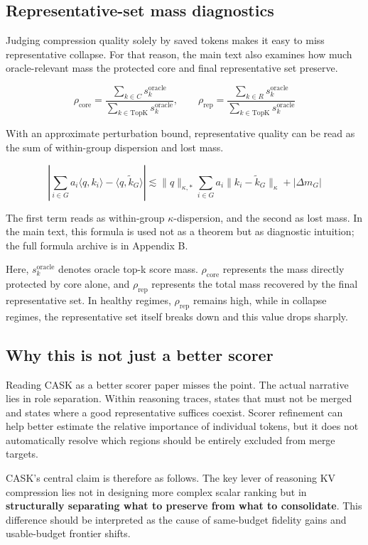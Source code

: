 \subsection{Representative-set mass diagnostics}


Judging compression quality solely by saved tokens makes it easy to miss representative collapse. For that reason, the main text also examines how much oracle-relevant mass the protected core and final representative set preserve.


$$
\rho_{\mathrm{core}}
=
\frac{\sum_{k \in C} s_k^{\mathrm{oracle}}}{\sum_{k \in \mathrm{TopK}} s_k^{\mathrm{oracle}}},
\qquad
\rho_{\mathrm{rep}}
=
\frac{\sum_{k \in R} s_k^{\mathrm{oracle}}}{\sum_{k \in \mathrm{TopK}} s_k^{\mathrm{oracle}}}
$$


With an approximate perturbation bound, representative quality can be read as the sum of within-group dispersion and lost mass.


$$
\left|\sum_{i \in G} a_i \langle q, k_i \rangle - \langle q, \tilde{k}_G \rangle\right|
\lesssim
\|q\|_{\kappa,*} \sum_{i \in G} a_i \|k_i - \tilde{k}_G\|_{\kappa}
+
|\Delta m_G|
$$


The first term reads as within-group $\kappa$-dispersion, and the second as lost mass. In the main text, this formula is used not as a theorem but as diagnostic intuition; the full formula archive is in Appendix B.


Here, $s_k^{\mathrm{oracle}}$ denotes oracle top-k score mass. $\rho_{\mathrm{core}}$ represents the mass directly protected by core alone, and $\rho_{\mathrm{rep}}$ represents the total mass recovered by the final representative set. In healthy regimes, $\rho_{\mathrm{rep}}$ remains high, while in collapse regimes, the representative set itself breaks down and this value drops sharply.


\subsection{Why this is not just a better scorer}


Reading CASK as a better scorer paper misses the point. The actual narrative lies in role separation. Within reasoning traces, states that must not be merged and states where a good representative suffices coexist. Scorer refinement can help better estimate the relative importance of individual tokens, but it does not automatically resolve which regions should be entirely excluded from merge targets.


CASK's central claim is therefore as follows. The key lever of reasoning KV compression lies not in designing more complex scalar ranking but in \textbf{structurally separating what to preserve from what to consolidate}. This difference should be interpreted as the cause of same-budget fidelity gains and usable-budget frontier shifts.


